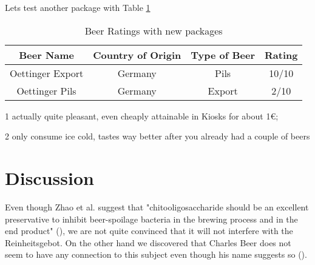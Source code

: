 \documentclass{article}
\begin{document}
\par
Lets test another package with Table \ref{table:2}
\begin{table}[h]
\begin{center}
\begin{threeparttable}
\begin{tabular}{c c c c}
    \toprule
    \textbf{Beer Name} & \textbf{Country of Origin} & \textbf{Type of Beer} & \textbf{Rating} \\ 
    \midrule
      Oettinger Export\tnote{1}   & Germany & Pils & 10/10 \\
      Oettinger Pils\tnote{2}   & Germany & Export & 2/10 \\ 
      \bottomrule
\end{tabular}
\begin{tablenotes}
\item[1] actually quite pleasant, even cheaply attainable in Kiosks for about 1€; \item[2] only consume ice cold, tastes way better after you already had a couple of beers
\end{tablenotes}
\end{threeparttable}
\end{center}
\caption{Beer Ratings with new packages}{}
\label{table:2}
\end{table}

\newpage
\section{Discussion}
Even though Zhao et al. suggest that "chitooligosaccharide should be an excellent preservative to inhibit beer-spoilage bacteria in the brewing process and in the end product" (\cite{Zhao2015}), we are not quite convinced that it will not interfere with the Reinheitsgebot. On the other hand we discovered that Charles Beer does not seem to have any connection to this subject even though his name suggests so (\cite{Beer2003}).






\printbibliography
\end{document}
